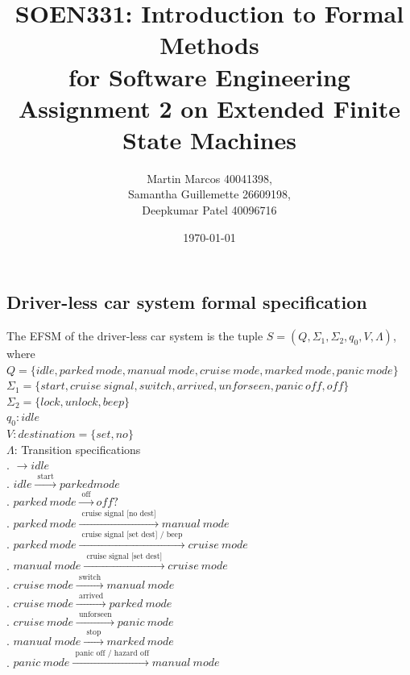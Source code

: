 \documentclass[12pt]{article}
\title{SOEN331: Introduction to Formal Methods\\for Software Engineering\\
Assignment 2 on Extended Finite State Machines}
\author{Martin Marcos 40041398,\\ Samantha Guillemette 26609198,\\ Deepkumar Patel 40096716  }
\date{\today}
\begin{document}
\begin{spacing}{1.5}

\maketitle

\newpage

\section{Driver-less car system formal specification}

\noindent The EFSM of the driver-less car system is the tuple $S = (Q, \Sigma_1, \Sigma_2, q_0, V, \Lambda)$, where\\

\noindent $Q = \{idle, parked~mode, manual~mode, cruise~mode, marked~mode, panic~mode\}$\\
\noindent $\Sigma_1 = \{start, cruise~signal, switch, arrived, unforseen,panic~off, off\}$\\
\noindent $\Sigma_2 = \{lock, unlock, beep\}$\\
\noindent $q_0: idle$\\
\noindent $V: destination = \{set, no\}$\\
\noindent $\Lambda$: Transition specifications\\
. $\rightarrow idle$\\
. $idle \xrightarrow {\text { start }} parked mode$\\
. $parked~mode  \xrightarrow {\text { off }} off?$\\
. $parked~mode  \xrightarrow {\text { cruise signal [no dest] }} manual~mode$\\
. $parked~mode  \xrightarrow {\text { cruise signal [set dest] / beep }} cruise~mode$\\
. $manual~mode  \xrightarrow {\text { cruise signal [set dest] }} cruise~mode$\\
. $cruise~mode  \xrightarrow {\text { switch }} manual~mode$\\
. $cruise~mode  \xrightarrow {\text { arrived }} parked~mode$\\
. $cruise~mode  \xrightarrow {\text { unforseen }} panic~mode$\\
. $manual~mode  \xrightarrow {\text { stop }} marked~mode$\\
. $panic~mode  \xrightarrow {\text { panic off / hazard off}} manual~mode$\\


\end{spacing}
\end{document}
